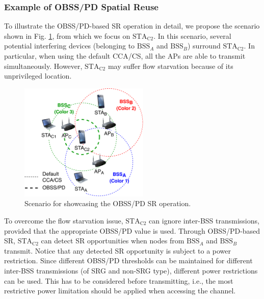 \documentclass{article}
\begin{document}
\subsubsection{Example of OBSS/PD Spatial Reuse}
To illustrate the OBSS/PD-based SR operation in detail, we propose the scenario shown in Fig. \ref{fig:fig_8_a}, from which we focus on $\text{STA}_\text{C2}$. In this scenario, several potential interfering devices (belonging to $\text{BSS}_A$ and $\text{BSS}_B$) surround $\text{STA}_\text{C2}$. In particular, when using the default CCA/CS, all the APs are able to transmit simultaneously. However, $\text{STA}_\text{C2}$ may suffer flow starvation because of its unprivileged location.
\begin{figure}[ht!]
	\centering
	\includegraphics[width=0.55\textwidth]{fig_11}
	\caption{Scenario for showcasing the OBSS/PD SR operation.}
	\label{fig:fig_8_a}
\end{figure}

To overcome the flow starvation issue, $\text{STA}_\text{C2}$ can ignore inter-BSS transmissions, provided that the appropriate OBSS/PD value is used. Through OBSS/PD-based SR, $\text{STA}_\text{C2}$ can detect SR opportunities when nodes from $\text{BSS}_A$ and $\text{BSS}_B$ transmit. Notice that any detected SR opportunity is subject to a power restriction. Since different OBSS/PD thresholds can be maintained for different inter-BSS transmissions (of SRG and non-SRG type), different power restrictions can be used. This has to be considered before transmitting, i.e., the most restrictive power limitation should be applied when accessing the channel.
\end{document}
